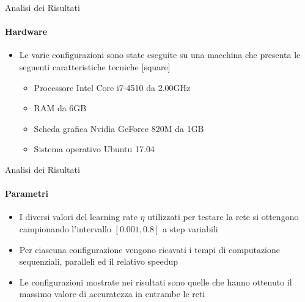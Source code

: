 \documentclass[
 ]{beamer}
\begin{document}
\begin{frame}{Analisi dei Risultati}
    \framesubtitle{Hardware}
    \smallskip
    \begin{itemize} [<+->]
        \setlength\itemsep{2em}
        \item \large Le varie configurazioni sono state eseguite su una macchina che presenta le seguenti caratteristiche tecniche       
        \bigskip
        [square] 
        \begin{itemize} [<+->] 
        \setlength\itemsep{2.5em}
            \item \large Processore Intel Core i7-4510 da 2.00GHz
            \item \large RAM da 6GB
            \item \large Scheda grafica Nvidia GeForce 820M da 1GB
            \item \large Sistema operativo Ubuntu 17.04                    
        \end{itemize}        
    \end{itemize}     
\end{frame}

\begin{frame}{Analisi dei Risultati}
    \framesubtitle{Parametri}
    \smallskip
    \begin{itemize} [<+->]
        \setlength\itemsep{2.5em}
        \item \large I diversi valori del learning rate $\eta$ utilizzati per testare la rete si ottengono campionando l'intervallo $[0.001, 0.8]$ a step variabili
        \item \large Per ciascuna configurazione vengono ricavati i tempi di computazione sequenziali, paralleli ed il relativo speedup
        \item \large Le configurazioni mostrate nei risultati sono quelle che hanno ottenuto il massimo valore di accuratezza in entrambe le reti
    \end{itemize}     
\end{frame}
\end{document}
